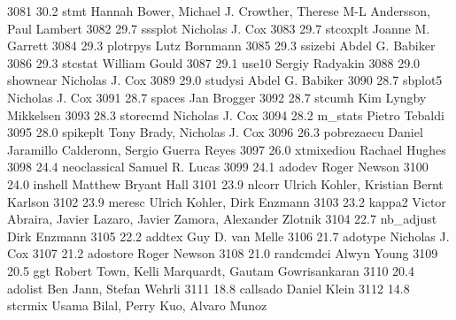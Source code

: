   3081     30.2    stmt          Hannah Bower, Michael J. Crowther,      
                                   Therese M-L Andersson, Paul Lambert     
  3082     29.7    sssplot       Nicholas J. Cox                         
  3083     29.7    stcoxplt      Joanne M. Garrett                       
  3084     29.3    plotrpys      Lutz Bornmann                           
  3085     29.3    ssizebi       Abdel G. Babiker                        
  3086     29.3    stcstat       William Gould                           
  3087     29.1    use10         Sergiy Radyakin                         
  3088     29.0    shownear      Nicholas J. Cox                         
  3089     29.0    studysi       Abdel G. Babiker                        
  3090     28.7    sbplot5       Nicholas J. Cox                         
  3091     28.7    spaces        Jan Brogger                             
  3092     28.7    stcumh        Kim Lyngby Mikkelsen                    
  3093     28.3    storecmd      Nicholas J. Cox                         
  3094     28.2    m_stats       Pietro Tebaldi                          
  3095     28.0    spikeplt      Tony Brady, Nicholas J. Cox             
  3096     26.3    pobrezaecu    Daniel Jaramillo Calderonn, Sergio      
                                   Guerra Reyes                            
  3097     26.0    xtmixediou    Rachael Hughes                          
  3098     24.4    neoclassical  Samuel R. Lucas                         
  3099     24.1    adodev        Roger Newson                            
  3100     24.0    inshell       Matthew Bryant Hall                     
  3101     23.9    nlcorr        Ulrich Kohler, Kristian Bernt Karlson   
  3102     23.9    meresc        Ulrich Kohler, Dirk Enzmann             
  3103     23.2    kappa2        Victor Abraira, Javier Lazaro, Javier   
                                   Zamora, Alexander Zlotnik               
  3104     22.7    nb_adjust     Dirk Enzmann                            
  3105     22.2    addtex        Guy D. van Melle                        
  3106     21.7    adotype       Nicholas J. Cox                         
  3107     21.2    adostore      Roger Newson                            
  3108     21.0    randcmdci     Alwyn Young                             
  3109     20.5    ggt           Robert Town, Kelli Marquardt, Gautam    
                                   Gowrisankaran                           
  3110     20.4    adolist       Ben Jann, Stefan Wehrli                 
  3111     18.8    callsado      Daniel Klein                            
  3112     14.8    stcrmix       Usama Bilal, Perry Kuo, Alvaro Munoz    
